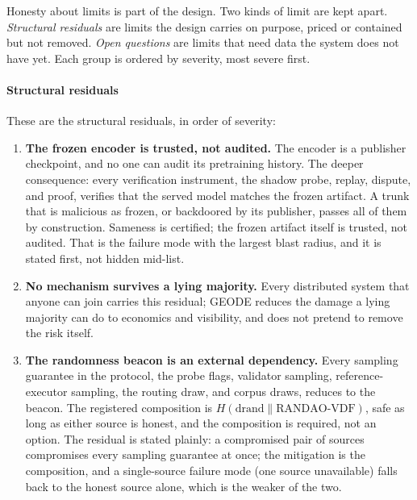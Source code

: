 \documentclass[11pt]{article}
\begin{document}
Honesty about limits is part of the design. Two kinds of limit
are kept apart. \emph{Structural residuals} are limits the design
carries on purpose, priced or contained but not removed. \emph{Open
    questions} are limits that need data the system does not have yet.
Each group is ordered by severity, most severe first.

\paragraph{Structural residuals}

These are the structural residuals, in order of severity:

\begin{enumerate}
    \item \textbf{The frozen encoder is trusted, not audited.} The
          encoder is a publisher checkpoint, and no one can audit its
          pretraining history. The deeper consequence: every verification
          instrument, the shadow probe, replay, dispute, and proof,
          verifies that the served model matches the frozen artifact. A
          trunk that is malicious as frozen, or backdoored by its
          publisher, passes all of them by construction. Sameness is
          certified; the frozen artifact itself is trusted, not audited.
          That is the failure mode with the largest blast radius, and it is
          stated first, not hidden mid-list.
    \item \textbf{No mechanism survives a lying majority.} Every
          distributed system that anyone can join carries this residual;
          GEODE reduces the damage a lying majority can do to economics and
          visibility, and does not pretend to remove the risk itself.
    \item \textbf{The randomness beacon is an external dependency.}
          Every sampling guarantee in the protocol, the probe flags,
          validator sampling, reference-executor sampling, the routing
          draw, and corpus draws, reduces to the beacon. The registered
          composition is $H(\text{drand} \parallel \text{RANDAO-VDF})$,
          safe as long as either source is honest, and the composition is
          required, not an option. The residual is stated plainly: a
          compromised pair of sources compromises every sampling guarantee
          at once; the mitigation is the composition, and a single-source
          failure mode (one source unavailable) falls back to the honest
          source alone, which is the weaker of the two.

\end{enumerate}
\end{document}

